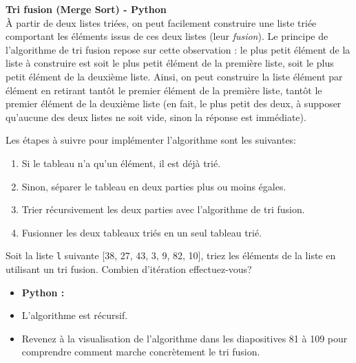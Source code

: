 \begin{Exercice} [30 minutes] \textbf{Tri fusion (Merge Sort) - Python} \\
    À partir de deux listes triées, on peut facilement construire une liste triée comportant les éléments issus de ces deux listes (leur \textit{fusion}). Le principe de l'algorithme de tri fusion repose sur cette observation : le plus petit élément de la liste à construire est soit le plus petit élément de la première liste, soit le plus petit élément de la deuxième liste. Ainsi, on peut construire la liste élément par élément en retirant tantôt le premier élément de la première liste, tantôt le premier élément de la deuxième liste (en fait, le plus petit des deux, à supposer qu'aucune des deux listes ne soit vide, sinon la réponse est immédiate). 
    
    Les étapes à suivre pour implémenter l'algorithme sont les suivantes:
    \begin{enumerate}
        \item Si le tableau n'a qu'un élément, il est déjà trié.
        \item Sinon, séparer le tableau en deux parties plus ou moins égales.
        \item Trier récursivement les deux parties avec l'algorithme de tri fusion.
        \item Fusionner les deux tableaux triés en un seul tableau trié.
    \end{enumerate}
    
    Soit la liste \lstinline{l} suivante [38, 27, 43, 3, 9, 82, 10], triez les éléments de la liste en utilisant un tri fusion. Combien d'itération effectuez-vous?
    
    \begin{itemize}
        \item \textbf{Python :}
            
    \end{itemize}
    
    \begin{conseil}
    \begin{itemize}
        \item L'algorithme est récursif. 
        \item Revenez à la visualisation de l'algorithme dans les diapositives 81 à 109 pour comprendre comment marche concrètement le tri fusion. 
    \end{itemize}
    
    \end{conseil}


\end{Exercice}
